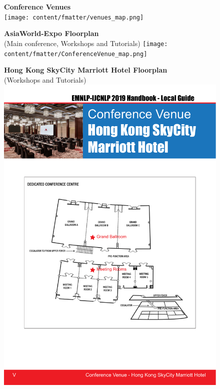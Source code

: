 

\begin{figure}[p]
\centering
\textbf{Conference Venues}\\
\vspace{3em}
\texttt{[image: content/fmatter/venues\_map.png]}
\end{figure}

\begin{figure}[p]
\centering
\textbf{AsiaWorld-Expo Floorplan}\\
(Main conference, Workshops and Tutorials)
\vspace{3em}
\texttt{[image: content/fmatter/ConferenceVenue\_map.png]}
\end{figure}

\begin{figure}[p]
\centering
\textbf{Hong Kong SkyCity Marriott Hotel Floorplan}\\
(Workshops and Tutorials)
\vspace{10em}
\includegraphics[width=\textwidth]{content/fmatter/Marriott_map.pdf}
\end{figure}

